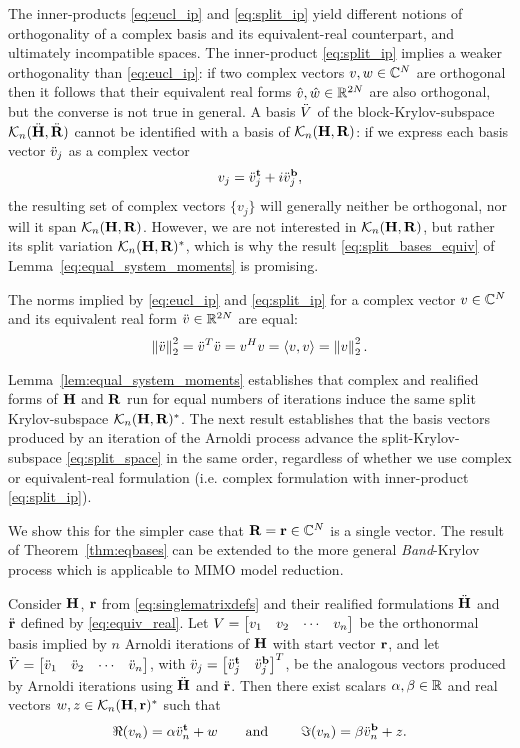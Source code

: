 The inner-products \eqref{eq:eucl_ip} and \eqref{eq:split_ip} yield
different notions of orthogonality of a complex basis
and its equivalent-real counterpart, and ultimately incompatible spaces.  The inner-product
\eqref{eq:split_ip} implies a weaker orthogonality than \eqref{eq:eucl_ip}:
if two complex vectors $v,w\in\mathbb{C}^N$ are orthogonal then it follows that their
equivalent real forms $\hat{v},\hat{w}\in\mathbb{R}^{2N}$ are also orthogonal, but the converse
is not true in general.
A basis $\ddot{V}$ of the block-Krylov-subspace  $\mathcal{K}_{n}({{\ddot{\textbf{\textup{H}}}}},{{\ddot{\textbf{\textup{R}}}}})$ cannot be
identified with a basis of $\mathcal{K}_{n}({\textbf{\textup{H}}},{\textbf{\textup{R}}})$:  if
we express each basis vector $\ddot{v}_j$ as a complex vector
\[
v_j = \ddot{v}^{\mathrm{\bf{t}}}_{j} + i\ddot{v}^{\mathrm{\bf{b}}}_{j},
\]
the resulting set of complex vectors $\{v_j\}$ will generally neither be orthogonal,
nor will it span $\mathcal{K}_{n}({\textbf{\textup{H}}},{\textbf{\textup{R}}})$.  However, we are not interested
in $\mathcal{K}_{n}({\textbf{\textup{H}}},{\textbf{\textup{R}}})$, but rather its split variation $\mathcal{K}_{n}({\textbf{\textup{H}}},{\textbf{\textup{R}}})^*$,
which is why the result \eqref{eq:split_bases_equiv} of Lemma~\ref{eq:equal_system_moments} is promising.

The norms implied by \eqref{eq:eucl_ip} and \eqref{eq:split_ip}  for a complex vector $v\in\mathbb{C}^N$ and its equivalent real form $\ddot{v}\in\mathbb{R}^{2N}$ are equal:
\begin{equation}
\nrm{2}{\veq}^2 = \veq^T \veq  = \c{v}v =  \ipr{v}{v} = \nrm{2}{v}^2 .
\label{eq:equiv_norms}
\end{equation}


Lemma~\ref{lem:equal_system_moments} establishes that complex and realified forms of $\textbf{\textup{H}}$ and $\textbf{\textup{R}}$ run for equal  numbers of iterations induce the same split Krylov-subspace  $\mathcal{K}_{n}({\textbf{\textup{H}}},{\textbf{\textup{R}}})^*$.  The next result establishes that the basis vectors produced by an iteration
of the Arnoldi process advance the split-Krylov-subspace \eqref{eq:split_space} in the same order, regardless of whether we use complex or equivalent-real formulation (i.e. complex formulation with inner-product \eqref{eq:split_ip}).

We show this for the simpler case that $\textbf{\textup{R}}=\textbf{\textup{r}}\in\mathbb{C}^N$ is a single vector.  The result of Theorem~\ref{thm:eqbases} can be extended to the more general \emph{Band}-Krylov process which is applicable to MIMO model reduction. 

\medskip
\begin{theorem} \label{thm:eqbases}Consider $\textbf{\textup{H}}$, $\textbf{\textup{r}}$ from \eqref{eq:singlematrixdefs} and their realified formulations ${\ddot{\textbf{\textup{H}}}}$ and $\ddot{\textbf{\textup{r}}}$ defined by \eqref{eq:equiv_real}.  Let
$V=\begin{bmatrix} v_1&v_2&\cdots&v_n\end{bmatrix}$ be the orthonormal basis implied by $n$ Arnoldi iterations of $\textbf{\textup{H}}$ with start vector $\textbf{\textup{r}}$, and let $\ddot{V}= \begin{bmatrix} \ddot{v}_1&\ddot{v}_2&\cdots&\ddot{v}_n\end{bmatrix}$, with $\ddot{v}_j = \begin{bmatrix} \ddot{v}^{\mathrm{\bf{t}}}_{j}& \ddot{v}^{\mathrm{\bf{b}}}_{j}\end{bmatrix}^T$, be the analogous vectors produced by Arnoldi iterations using ${\ddot{\textbf{\textup{H}}}}$ and $\ddot{\textbf{\textup{r}}}$.
Then there exist scalars $\alpha, \beta\in\mathbb{R}$ and real vectors $w,z\in \mathcal{K}_{n}({\textbf{\textup{H}}},{\textbf{\textup{r}}})^*$ such that
	\begin{equation}
	   	\Re(v_n) = \alpha\tp{\veq}{n} + w \qquad\text{and }\qquad
		 \Im(v_n) = \beta\bt{\veq}{n} + z.
     \label{eq:equ_bases}
	\end{equation}
\end{theorem}

